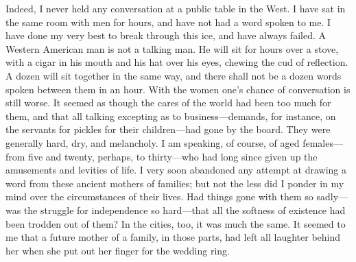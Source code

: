 Indeed, I never held any conversation at a public table in the
West.  I have sat in the same room with men for hours, and have not
had a word spoken to me.  I have done my very best to break through
this ice, and have always failed.  A Western American man is not a
talking man.  He will sit for hours over a stove, with a cigar in
his mouth and his hat over his eyes, chewing the cud of reflection.
A dozen will sit together in the same way, and there shall not be a
dozen words spoken between them in an hour.  With the women one's
chance of conversation is still worse.  It seemed as though the
cares of the world had been too much for them, and that all talking
excepting as to business---demands, for instance, on the servants
for pickles for their children---had gone by the board.  They were
generally hard, dry, and melancholy.  I am speaking, of course, of
aged females---from five and twenty, perhaps, to thirty---who had
long since given up the amusements and levities of life.  I very
soon abandoned any attempt at drawing a word from these ancient
mothers of families; but not the less did I ponder in my mind over
the circumstances of their lives.  Had things gone with them so
sadly---was the struggle for independence so hard---that all the
softness of existence had been trodden out of them?  In the cities,
too, it was much the same.  It seemed to me that a future mother of
a family, in those parts, had left all laughter behind her when she
put out her finger for the wedding ring.

